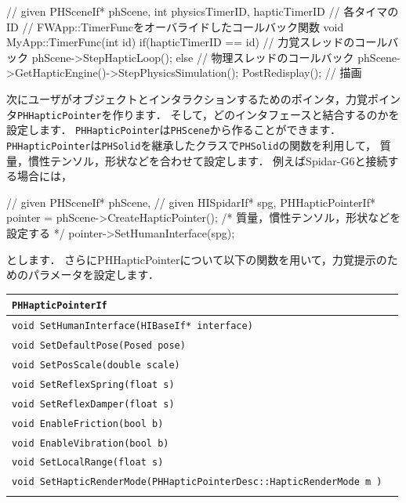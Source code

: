 \begin{sourcecode}
	// given PHSceneIf* phScene,
	int physicsTimerID, hapticTimerID // 各タイマのID
	// FWApp::TimerFuncをオーバライドしたコールバック関数
	void MyApp::TimerFunc(int id){
        if(hapticTimerID == id){
            // 力覚スレッドのコールバック
            phScene->StepHapticLoop();	
        }else{
            // 物理スレッドのコールバック
            phScene->GetHapticEngine()->StepPhysicsSimulation();	
            PostRedisplay();	// 描画
        }	
	}	
\end{sourcecode}


\KLUDGE 次にユーザがオブジェクトとインタラクションするためのポインタ，力覚ポインタ\texttt{PHHapticPointer}\KLUDGE を作ります．
\KLUDGE そして，どのインタフェースと結合するのかを設定します．
\texttt{PHHapticPointer}\KLUDGE は\texttt{PHScene}\KLUDGE から作ることができます．
\texttt{PHHapticPointer}\KLUDGE は\texttt{PHSolid}\KLUDGE を継承したクラスで\texttt{PHSolid}\KLUDGE の関数を利用して，
\KLUDGE 質量，慣性テンソル，形状などを合わせて設定します．
\KLUDGE 例えばSpidar-G6\KLUDGE と接続する場合には，

\begin{sourcecode}
	// given PHSceneIf* phScene,
	// given HISpidarIf* spg,
    PHHapticPointerIf* pointer = phScene->CreateHapticPointer();
    /*
        質量，慣性テンソル，形状などを設定する
    */
    pointer->SetHumanInterface(spg);
\end{sourcecode}
\KLUDGE とします．
\KLUDGE さらにPHHapticPointer\KLUDGE について以下の関数を用いて，力覚提示のためのパラメータを設定します．

\noindent
\begin{tabular}{p{.8\hsize}p{.1\hsize}}
\\
\texttt{PHHapticPointerIf}													\\ \midrule
\texttt{void SetHumanInterface(HIBaseIf* interface)}						&	\\
\texttt{void SetDefaultPose(Posed pose)}									&	\\
\texttt{void SetPosScale(double scale)}										&	\\
\texttt{void SetReflexSpring(float s)}										&	\\
\texttt{void SetReflexDamper(float s)}										&	\\
\texttt{void EnableFriction(bool b)}										&	\\
\texttt{void EnableVibration(bool b)}										&	\\
\texttt{void SetLocalRange(float s)}										&	\\
\texttt{void SetHapticRenderMode(PHHapticPointerDesc::HapticRenderMode m )}	&	\\
\\
\end{tabular}

